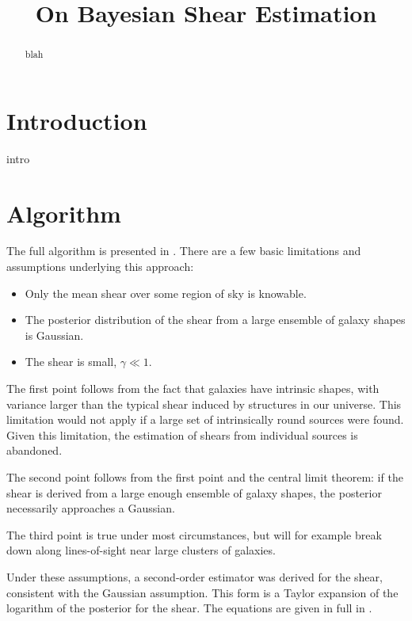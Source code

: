 \documentclass[12pt,preprint]{aastex}
\begin{document}
\title{On Bayesian Shear Estimation}



\begin{abstract}

blah

\end{abstract}

\section{Introduction} \label{sec:intro}

intro

\section{Algorithm} \label{sec:algo}

The full algorithm is presented in \citet[][BA13]{ba13}.  There are a few basic
limitations and assumptions underlying this approach:

\begin{itemize}

    \item Only the mean shear over some region of sky is knowable.

    \item The posterior distribution of the shear from a large ensemble of
        galaxy shapes is Gaussian.

    \item The shear is small, $\gamma \ll 1$.

\end{itemize}

The first point follows from the fact that galaxies have intrinsic shapes, with
variance larger than the typical shear induced by structures in our universe.
This limitation would not apply if a large set of intrinsically round sources
were found.  Given this limitation, the estimation of shears from individual
sources is abandoned.

The second point follows from the first point and the central limit theorem: if
the shear is derived from a large enough ensemble of galaxy shapes, the
posterior necessarily approaches a Gaussian.

The third point is true under most circumstances, but will for example break
down along lines-of-sight near large clusters of galaxies.

Under these assumptions, a second-order estimator was derived for the shear,
consistent with the Gaussian assumption.  This form is a Taylor expansion of
the logarithm of the posterior for the shear.  The equations are given in full
in \citet{ba13}.
\end{document}

